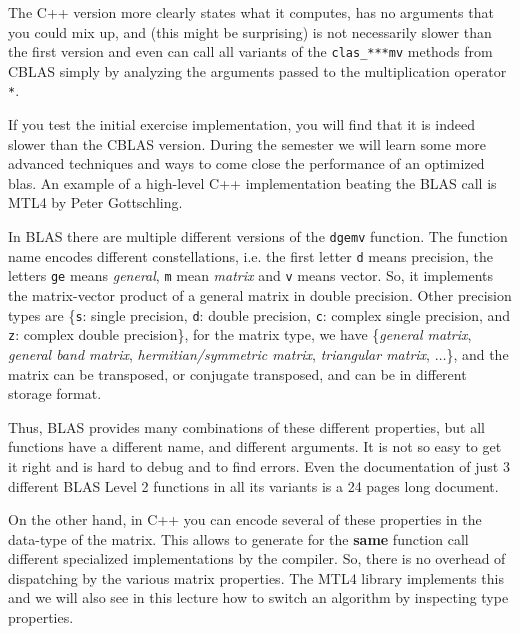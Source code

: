 The C++ version more clearly states what it computes, has no arguments that you could mix up, and (this might be
surprising) is not necessarily slower than the first version and even can call all variants of the \texttt{clas\_***mv} methods
from CBLAS simply by analyzing the arguments passed to the multiplication operator \texttt{*}.

\begin{rem}
  If you test the initial exercise implementation, you will find that it is indeed slower than the CBLAS version. During the semester
  we will learn some more advanced techniques and ways to come close the performance of an optimized blas. An example of a high-level
  C++ implementation beating the BLAS call is MTL4 by Peter Gottschling.
\end{rem}

\begin{rem}
  In BLAS there are multiple different versions of the \texttt{dgemv} function. The function name encodes different constellations, i.e.
  the first letter \texttt{d} means  precision, the letters \texttt{ge} means \emph{general}, \texttt{m} mean \emph{matrix}
  and \texttt{v} means vector. So, it implements the matrix-vector product of a general matrix in double precision. Other precision
  types are \{\texttt{s}: single precision, \texttt{d}: double precision, \texttt{c}: complex single precision, and \texttt{z}: complex
  double precision\}, for the matrix type, we have \{\emph{general matrix}, \emph{general band matrix}, \emph{hermitian/symmetric matrix},
  \emph{triangular matrix}, $\ldots$\}, and the matrix can be transposed, or conjugate transposed, and can be in different storage format.

  Thus, BLAS provides many combinations of these different properties, but all functions have a different name, and different arguments. It
  is not so easy to get it right and is hard to debug and to find errors. Even the documentation of just 3 different BLAS Level 2 functions
  in all its variants is a 24 pages long document.

  On the other hand, in C++ you can encode several of these properties in the data-type of the matrix. This allows to generate for the \textbf{same}
  function call different specialized implementations by the compiler. So, there is no overhead of dispatching by the various matrix properties.
  The MTL4 library implements this and we will also see in this lecture how to switch an algorithm by inspecting type properties.
\end{rem}

